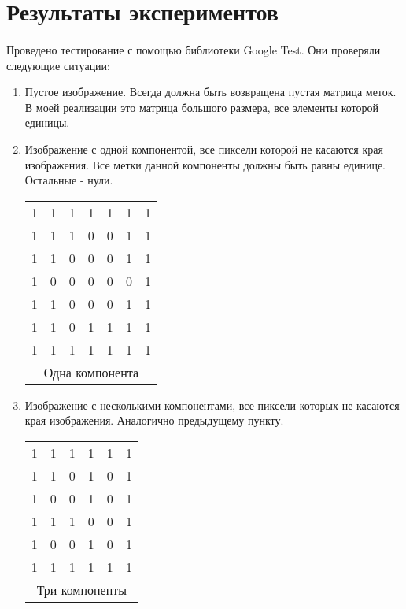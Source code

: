 \documentclass[14pt]{extarticle}
\begin{document}
\section{Результаты экспериментов}
\paragraph{} Проведено тестирование с помощью библиотеки Google Test. Они проверяли следующие ситуации:
\begin{enumerate}
    \item Пустое изображение. Всегда должна быть возвращена пустая матрица меток. В моей реализации это матрица большого размера, все элементы которой единицы.
    \item Изображение с одной компонентой, все пиксели которой не касаются края изображения. Все метки данной компоненты должны быть равны единице. Остальные - нули.
    \\\begin{center}\begin{tabular}{ |c c c c c c c| }
    \hline
     1 & 1 & 1 & 1 & 1 & 1 & 1\\
     1 & 1 & 1 & 0 & 0&1&1\\
     1 & 1 & 0 & 0 & 0&1&1\\
     1 & 0 & 0 & 0 & 0&0&1\\
     1 & 1 &0 & 0 & 0&1&1\\
     1&1&0&1&1&1&1\\
     1&1&1&1&1&1&1\\
     \hline
     \multicolumn{7}{c}{Одна компонента}
    \end{tabular}
    \end{center}
    \item Изображение с несколькими компонентами, все пиксели которых не касаются края изображения. Аналогично предыдущему пункту.
    \\\begin{center}\begin{tabular}{ |c c c c c c | }
    \hline
     1 & 1 & 1 & 1 & 1 & 1\\
     1 & 1 & 0 & 1 & 0&1\\
     1 & 0 & 0 & 1 & 0&1\\
     1 & 1 & 1 & 0 & 0&1\\
     1 & 0 &0 & 1 & 0&1\\
     1&1&1&1&1&1\\
     \hline
     \multicolumn{6}{c}{Три компоненты}
    \end{tabular}

\end{center}
\end{enumerate}
\end{document}
